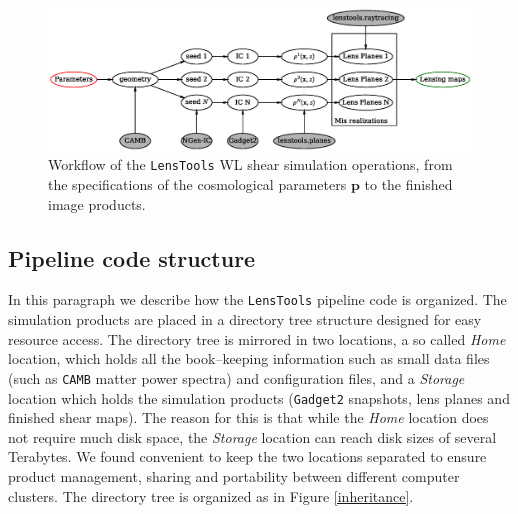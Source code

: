 \documentclass[reprint,aps,prd,superscriptaddress,showkeys,showpacs]{revtex4-1}
\newcommand{\bb}[1]{\mathbf{#1}}
\newcommand{\ttt}[1]{\texttt{#1}}
\newcommand{\LT}{\texttt{LensTools} }
\begin{document}
\begin{figure}
\includegraphics[scale=0.6]{Figures/flow.eps}
\caption{Workflow of the \LT WL shear simulation operations, from the specifications of the cosmological parameters $\bb{p}$ to the finished image products.}
\label{pipescheme}
\end{figure}

\subsection{Pipeline code structure}
%
In this paragraph we describe how the \LT pipeline code is organized. The simulation products are placed in a directory tree structure designed for easy resource access. The directory tree is mirrored in two locations, a so called \textit{Home} location, which holds all the book--keeping information such as small data files (such as \ttt{CAMB} matter power spectra) and configuration files, and a \textit{Storage} location which holds the simulation products (\ttt{Gadget2} snapshots, lens planes and finished shear maps). The reason for this is that while the \textit{Home} location does not require much disk space, the \textit{Storage} location can reach disk sizes of several Terabytes. We found convenient to keep the two locations separated to ensure product management, sharing and portability between different computer clusters. The directory tree is organized as in Figure \ref{inheritance}. 
\end{document}
